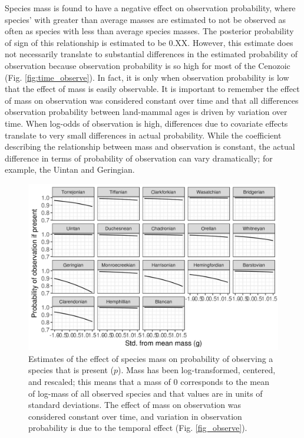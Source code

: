 \documentclass[12pt,letterpaper]{article}
\begin{document}
Species mass is found to have a negative effect on observation probability, where species' with greater than average masses are estimated to not be observed as often as species with less than average species masses. The posterior probability of sign of this relationship is estimated to be 0.XX. However, this estimate does not necessarily translate to substantial differences in the estimated probability of observation because observation probability is so high for most of the Cenozoic (Fig. \ref{fig:time_observe}). In fact, it is only when observation probability is low that the effect of mass is easily observable. It is important to remember the effect of mass on observation was considered constant over time and that all differences observation probability between land-mammal ages is driven by variation over time. When log-odds of observation is high, differences due to covariate effects translate to very small differences in actual probability. While the coefficient describing the relationship between mass and observation is constant, the actual difference in terms of probability of observation can vary dramatically; for example, the Uintan and Geringian. 
\begin{figure}[ht]
  \centering
  \includegraphics[width=\textwidth,height=0.4\textheight,keepaspectratio=true]{figure/mass_on_pres_bd}
  \caption[Estimates of the effect of mass on observation probability]{Estimates of the effect of species mass on probability of observing a species that is present (\(p\)). Mass has been log-transformed, centered, and rescaled; this means that a mass of 0 corresponds to the mean of log-mass of all observed species and that values are in units of standard deviations. The effect of mass on observation was considered constant over time, and variation in observation probability is due to the temporal effect (Fig. \ref{fig_observe}).} 
  \label{fig:mass_observe}
\end{figure}
\end{document}
